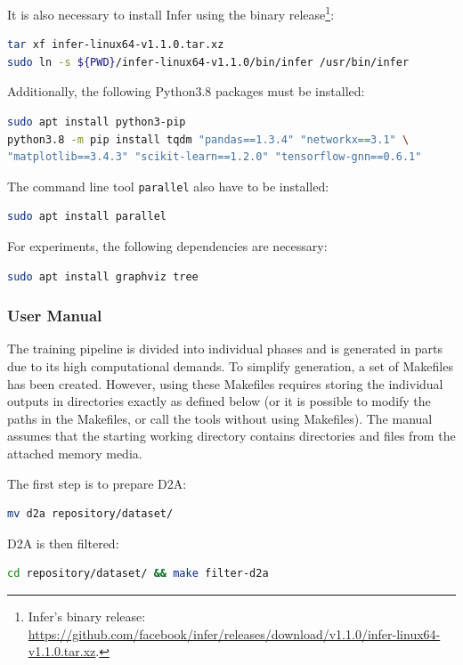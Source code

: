 It is also necessary to install Infer using the binary release\footnote{Infer's binary release: \url{https://github.com/facebook/infer/releases/download/v1.1.0/infer-linux64-v1.1.0.tar.xz}.}:
\begin{lstlisting}[language=bash, xleftmargin=2em]
tar xf infer-linux64-v1.1.0.tar.xz
sudo ln -s ${PWD}/infer-linux64-v1.1.0/bin/infer /usr/bin/infer
\end{lstlisting}

Additionally, the following Python3.8 packages must be installed:
\begin{lstlisting}[language=bash, xleftmargin=2em]
sudo apt install python3-pip
python3.8 -m pip install tqdm "pandas==1.3.4" "networkx==3.1" \
"matplotlib==3.4.3" "scikit-learn==1.2.0" "tensorflow-gnn==0.6.1"
\end{lstlisting}

The command line tool \texttt{parallel} also have to be installed:
\begin{lstlisting}[language=bash, xleftmargin=2em]
sudo apt install parallel
\end{lstlisting}

For experiments, the following dependencies are necessary:
\begin{lstlisting}[language=bash, xleftmargin=2em]
sudo apt install graphviz tree
\end{lstlisting}


\subsubsection{User Manual}
The training pipeline is divided into individual phases and is generated in parts due to its high computational demands. To simplify generation, a set of Makefiles has been created. However, using these Makefiles requires storing the individual outputs in directories exactly as defined below (or it is possible to modify the paths in the Makefiles, or call the tools without using Makefiles). The manual assumes that the starting working directory contains directories and files from the attached memory media.

The first step is to prepare D2A:
\begin{lstlisting}[language=bash, xleftmargin=2em]
mv d2a repository/dataset/
\end{lstlisting}

D2A is then filtered:
\begin{lstlisting}[language=bash, xleftmargin=2em]
cd repository/dataset/ && make filter-d2a
\end{lstlisting}

